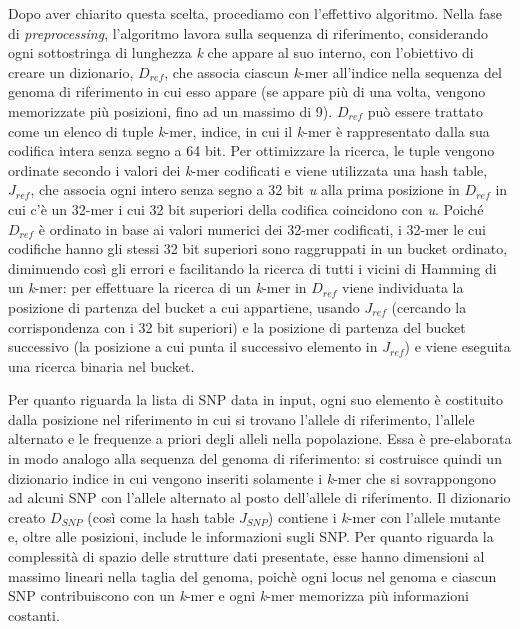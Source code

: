 \documentclass[../main.tex]{subfiles}
\begin{document}
\noindent
Dopo aver chiarito questa scelta, procediamo con l’effettivo algoritmo. Nella fase di \textit{preprocessing}, l'algoritmo lavora sulla sequenza di riferimento, considerando ogni sottostringa di lunghezza \textit{k} che appare al suo interno, con l'obiettivo di creare un dizionario, $D_{ref}$, che associa ciascun \textit{k}-mer all'indice nella sequenza del genoma di riferimento in cui esso appare (se appare più di una volta, vengono memorizzate più posizioni, fino ad un massimo di 9). $D_{ref}$ può essere trattato come un elenco di tuple \textlangle \textit{k}-mer, indice\textrangle, in cui il \textit{k}-mer è rappresentato dalla sua codifica intera senza segno a 64 bit. Per ottimizzare la ricerca, le tuple vengono ordinate secondo i valori dei \textit{k}-mer codificati e viene utilizzata una hash table, $J_{ref}$, che associa ogni intero senza segno a 32 bit \textit{u} alla prima posizione in $D_{ref}$ in cui c'è un 32-mer i cui 32 bit superiori della codifica coincidono con \textit{u}. Poiché $D_{ref}$ è ordinato in base ai valori numerici dei 32-mer codificati, i 32-mer le cui codifiche hanno gli stessi 32 bit superiori sono raggruppati in un bucket ordinato, diminuendo così gli errori e facilitando la ricerca di tutti i vicini di Hamming di un \textit{k}-mer: per effettuare la ricerca di un \textit{k}-mer in $D_{ref}$ viene individuata la posizione di partenza del bucket a cui appartiene, usando $J_{ref}$ (cercando la corrispondenza con i 32 bit superiori) e la posizione di partenza del bucket successivo (la posizione a cui punta il successivo elemento in $J_{ref}$) e viene eseguita una ricerca binaria nel bucket.

Per quanto riguarda la lista di SNP data in input, ogni suo elemento è costituito dalla posizione nel riferimento in cui si trovano l'allele di riferimento, l'allele alternato e le frequenze a priori degli alleli nella popolazione. Essa è pre-elaborata in modo analogo alla sequenza del genoma di riferimento: si costruisce quindi un dizionario indice in cui vengono inseriti solamente i \textit{k}-mer che si sovrappongono ad alcuni SNP con l'allele alternato al posto dell'allele di riferimento. Il dizionario creato $D_{SNP}$ (così come la hash table $J_{SNP}$) contiene i \textit{k}-mer con l'allele mutante e, oltre alle posizioni, include le informazioni sugli SNP. 
Per quanto riguarda la complessità di spazio delle strutture dati presentate, esse hanno dimensioni al massimo lineari nella taglia del genoma, poichè ogni locus nel genoma e ciascun SNP contribuiscono con un \textit{k}-mer e ogni \textit{k}-mer memorizza più informazioni costanti.\\
\end{document}
